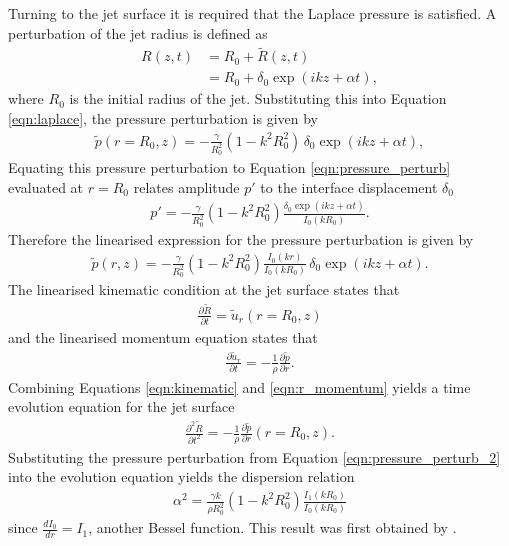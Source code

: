 \documentclass[11pt]{article}
\newcommand{\od}[2]{\frac{d #1}{d #2}}
\newcommand{\pd}[2]{\frac{\partial #1}{\partial #2}}
\newcommand{\pdtwo}[2]{\frac{\partial ^2 #1}{\partial #2 ^2}}
\begin{document}
Turning to the jet surface it is required that the Laplace pressure is satisfied. A perturbation of the jet radius is defined as
\begin{align*}
R(z,t) &=  R_0 + \tilde{R} (z,t) \nonumber \\
& = R_0 + \delta_0 \exp(ikz + \alpha t),
\end{align*}
where $R_0$ is the initial radius of the jet. Substituting this into Equation \ref{eqn:laplace}, the pressure perturbation is given by
\begin{align*}
\tilde{p}(r=R_0,z) = -\frac{\gamma}{R_0^2} (1 - k^2 R_0^2) \, \delta_0 \exp(ikz + \alpha t),
\end{align*}
Equating this pressure perturbation to Equation \ref{eqn:pressure_perturb} evaluated at $r=R_0$ relates amplitude $p'$ to the interface displacement $\delta_0$
\begin{align*}
p' = -\frac{\gamma}{R_0^2}(1-k^2 R_0^2) \frac{\delta_0 \exp (ikz + \alpha t)}{I_0(kR_0)}.
\end{align*}
Therefore the linearised expression for the pressure perturbation is given by
\begin{align}
\tilde{p}(r,z) = -\frac{\gamma}{R_0^2} (1 - k^2 R_0^2) \frac{I_0(kr)}{I_0 (kR_0)} \, \delta_0 \exp(ikz + \alpha t).
\label{eqn:pressure_perturb_2}
\end{align}
The linearised kinematic condition at the jet surface states that
\begin{align}
\pd{\tilde{R}}{t} = \tilde{u}_r(r =R_0,z)
\label{eqn:kinematic}
\end{align}
and the linearised momentum equation states that
\begin{align}
\pd{\tilde{u}_r}{t} = - \frac{1}{\rho} \pd{\tilde{p}}{r}.
\label{eqn:r_momentum}
\end{align}
Combining Equations \ref{eqn:kinematic} and \ref{eqn:r_momentum} yields a time evolution equation for the jet surface
\begin{align}
\pdtwo{\tilde{R}}{t} = - \frac{1}{\rho} \pd{\tilde{p}}{r}(r = R_0, z).
\end{align}
Substituting the pressure perturbation from Equation \ref{eqn:pressure_perturb_2} into the evolution equation yields the dispersion relation
\begin{align}
\alpha^2 = \frac{\gamma k}{\rho R_0^2} (1 - k^2 R_0^2) \frac{I_1(kR_0)}{I_0(kR_0)}
\label{eqn:dispersion_rayleigh}
\end{align}
since $\od{I_0}{r} = I_1$, another Bessel function. This result was first obtained by \cite{strutt1878instability}.
\end{document}
